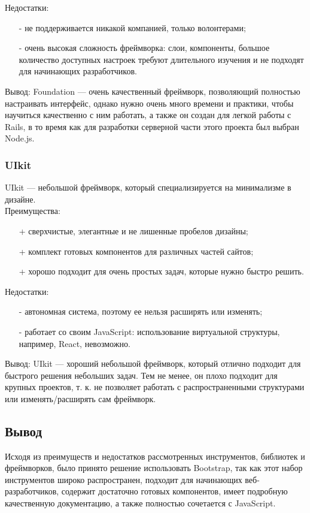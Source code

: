 \documentclass[a4paper,12pt]{article}
\begin{document}
Недостатки:
\begin{itemize}
	\item[-] не поддерживается никакой компанией, только волонтерами;
	\item[-] очень высокая сложность фреймворка: слои, компоненты, большое количество доступных настроек требуют длительного изучения и не подходят для начинающих разработчиков.\\
\end{itemize}

Вывод: Foundation — очень качественный фреймворк, позволяющий полностью настраивать интерфейс, однако нужно очень много времени и практики, чтобы научиться качественно с ним работать, а также он создан для легкой работы с Rails, в то время как для разработки серверной части этого проекта был выбран Node.js.\\

\subsubsection{UIkit}
UIkit — небольшой фреймворк, который специализируется на минимализме в дизайне.\\
Преимущества:
\begin{itemize}
	\item[+] сверхчистые, элегантные и не лишенные пробелов дизайны;
	\item[+] комплект готовых компонентов для различных частей сайтов;
	\item[+] хорошо подходит для очень простых задач, которые нужно быстро решить.
\end{itemize}

Недостатки:
\begin{itemize}
	\item[-] автономная система, поэтому ее нельзя расширять или изменять;
	\item[-] работает со своим JavaScript: использование виртуальной структуры, например, React, невозможно.\\
\end{itemize}

Вывод: UIkit — хороший небольшой фреймворк, который отлично подходит для быстрого решения небольших задач. Тем не менее, он плохо подходит для крупных проектов, т. к. не позволяет работать с распространенными структурами или изменять/расширять сам фреймворк.\\

\subsection{Вывод}
Исходя из преимуществ и недостатков рассмотренных инструментов, библиотек и фреймворков, было принято решение использовать Bootstrap, так как этот набор инструментов широко распространен, подходит для начинающих веб-разработчиков, содержит достаточно готовых компонентов, имеет подробную качественную документацию, а также полностью сочетается с JavaScript.\\
\end{document}

